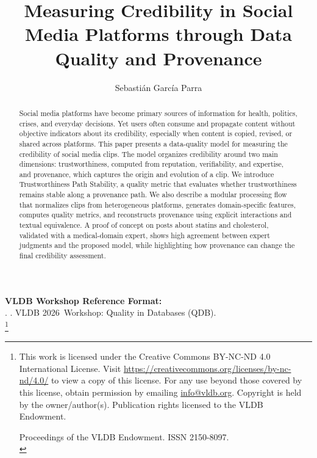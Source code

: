 \documentclass[sigconf, nonacm]{acmart}
\newcommand\vldbyear{2026}
\newcommand\vldbworkshop{Quality in Databases (QDB)}
\newcommand\vldbauthors{\authors}
\newcommand\vldbtitle{\shorttitle}
\newcommand\vldbpagestyle{plain}
\begin{document}
\title[Credibility Measurement in Social Media]{Measuring Credibility in Social Media Platforms through Data Quality and Provenance}

\author{Sebasti\'an Garc\'ia Parra}

\begin{abstract}
Social media platforms have become primary sources of information for health,
politics, crises, and everyday decisions. Yet users often consume and propagate
content without objective indicators about its credibility, especially when
content is copied, revised, or shared across platforms. This paper presents a
data-quality model for measuring the credibility of social media clips. The model
organizes credibility around two main dimensions: trustworthiness, computed from
reputation, verifiability, and expertise, and provenance, which captures the
origin and evolution of a clip. We introduce Trustworthiness Path Stability, a
quality metric that evaluates whether trustworthiness remains stable along a
provenance path. We also describe a modular processing flow that normalizes clips
from heterogeneous platforms, generates domain-specific features, computes
quality metrics, and reconstructs provenance using explicit interactions and
textual equivalence. A proof of concept on posts about statins and cholesterol,
validated with a medical-domain expert, shows high agreement between expert
judgments and the proposed model, while highlighting how provenance can change
the final credibility assessment.
\end{abstract}

\maketitle

\pagestyle{\vldbpagestyle}
\begingroup\small\noindent\raggedright\textbf{VLDB Workshop Reference Format:}\\
\vldbauthors. \vldbtitle. VLDB \vldbyear\ Workshop: \vldbworkshop.\\
\endgroup
\begingroup
\renewcommand\thefootnote{}\footnote{\noindent
This work is licensed under the Creative Commons BY-NC-ND 4.0 International License. Visit \url{https://creativecommons.org/licenses/by-nc-nd/4.0/} to view a copy of this license. For any use beyond those covered by this license, obtain permission by emailing \href{mailto:info@vldb.org}{info@vldb.org}. Copyright is held by the owner/author(s). Publication rights licensed to the VLDB Endowment. \\
\raggedright Proceedings of the VLDB Endowment.
ISSN 2150-8097. \\
}\addtocounter{footnote}{-1}\endgroup
\end{document}
